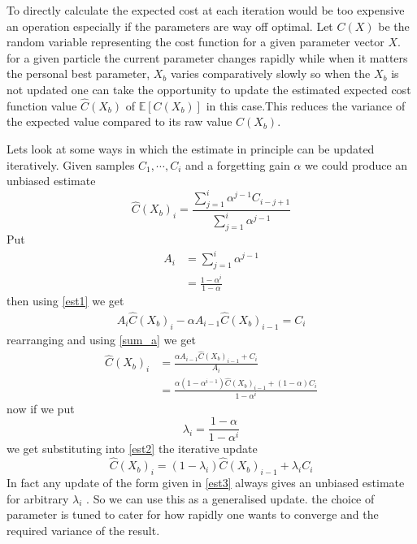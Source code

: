 \documentclass[a4paper,oneside,english]{book}
\numberwithin{equation}{section}
\numberwithin{figure}{section}
\begin{document}
To directly calculate the expected cost at each iteration would be too expensive an operation especially if the parameters are way off optimal. Let $C(X)$ be the random variable representing the cost function for a given parameter vector $X$. for a given particle the current parameter changes rapidly while when it matters the personal best parameter, $X_b$ varies comparatively slowly so  when the $X_b$ is not updated one can take the opportunity to update the estimated expected cost function value $\hat{C}(X_b)$ of $\mathbb{E}[C(X_b)]$ in this case.This reduces the variance of the expected value compared to its raw value $C(X_b)$. 

Lets look at some ways in which the estimate in principle can be updated iteratively. Given samples $C_1,\cdots,C_i$ and a forgetting gain $\alpha$ we could produce an unbiased estimate
\begin{equation}
\label{est1}
\hat{C}(X_b)_i=\frac{\sum_{j=1}^i\alpha^{j-1}C_{i-j+1}}{\sum_{j=1}^i\alpha^{j-1}}
\end{equation}
Put 
\begin{align}
A_i&=\sum_{j=1}^i\alpha^{j-1}\\
\label{sum_a}
&=\frac{1-\alpha^i}{1-\alpha}
\end{align}
then using \eqref{est1} we get
\begin{align}
A_{i}\hat{C}(X_b)_{i}-\alpha A_{i-1}\hat{C}(X_b)_{i-1}=C_i
\end{align}
rearranging and using \eqref{sum_a} we get
\begin{align}
\hat{C}(X_b)_{i}&=\frac{\alpha A_{i-1}\hat{C}(X_b)_{i-1}+C_i}{A_{i}}\\
\label{est2}
&=\frac{\alpha(1-\alpha^{i-1})\hat{C}(X_b)_{i-1}+(1-\alpha)C_i}
{1-\alpha^{i}}
\end{align}
now if we put 
\begin{equation}\label{lam1}
\lambda_i=\frac{1-\alpha}{1-\alpha^{i}}
\end{equation}
we get substituting into \eqref{est2} the iterative update
\begin{equation}\label{est3}
\hat{C}(X_b)_{i}=(1-\lambda_i)\hat{C}(X_b)_{i-1}+\lambda_i C_i
\end{equation}
In fact any update of the form given in \eqref{est3} always gives an unbiased estimate  for arbitrary $\lambda_i$ . So we can use this as a generalised update. the choice of parameter is tuned to cater for how rapidly one wants to converge and the required variance of the result.
\end{document}
